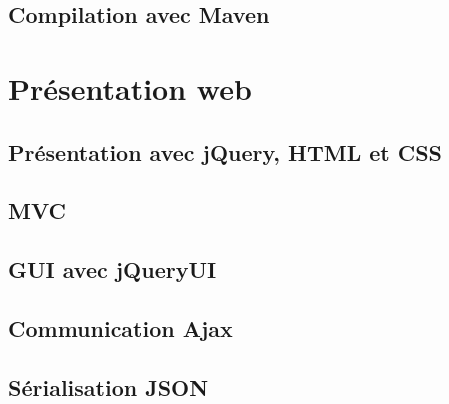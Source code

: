 \documentclass{article}
\begin{document}
\subsection{Compilation avec Maven} %
\label{sub:coordonateur_de_services_compilation_avec_maven}


\section{Présentation web} %
\label{sec:presentation_web}

\subsection{Présentation avec jQuery, HTML et CSS} %
\label{sub:presentation_avec_jquery_html_et_css}

\subsection{MVC} %
\label{sub:mvc}

\subsection{GUI avec jQueryUI} %
\label{sub:gui_avec_jqueryui}

\subsection{Communication Ajax} %
\label{sub:communication_ajax}

\subsection{Sérialisation JSON} %
\label{sub:serialisation_json}

\end{document}
